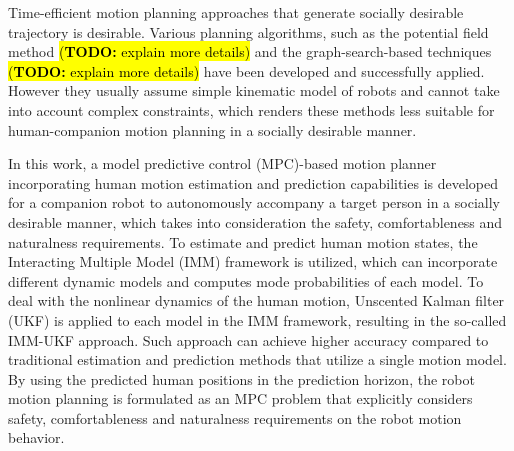 \documentclass[letterpaper, 10 pt, conference]{ieeeconf}
\newcommand{\todohere}[1]{\hl{(\textbf{TODO:} #1)}}
\begin{document}
	Time-efficient motion planning approaches that generate socially desirable trajectory is desirable.
	Various planning algorithms, such as the potential field method\cite{khatib1986real} \todohere{explain more details} and the graph-search-based techniques\cite{cosgun2013autonomous} \todohere{explain more details} have been developed and successfully applied.
	However they usually assume simple kinematic model of robots and cannot take into account complex constraints, which renders these methods less suitable for human-companion motion planning in a socially desirable manner.
	
	In this work, a model predictive control (MPC)-based motion planner incorporating human motion estimation and prediction capabilities is developed for a companion robot to autonomously accompany a target person in a socially desirable manner, which takes into consideration the safety, comfortableness and naturalness requirements. 
	To estimate and predict human motion states, the Interacting Multiple Model (IMM) framework is utilized, which can incorporate different dynamic models and computes mode probabilities of each model. 
	To deal with the nonlinear dynamics of the human motion, Unscented Kalman filter (UKF) is applied to each model in the IMM framework, resulting in the so-called IMM-UKF approach. 
	Such approach can achieve higher accuracy compared to traditional estimation and prediction methods that utilize a single motion model. 
	By using the predicted human positions in the prediction horizon, the robot motion planning is formulated as an MPC problem that explicitly considers safety, comfortableness and naturalness requirements on the robot motion behavior. 
	
\end{document}
